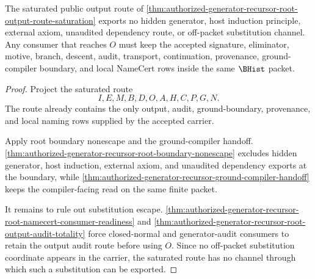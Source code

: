 \begin{theorem}
\label{thm:authorized-generator-recursor-root-boundary-nonescape-saturation}
The saturated public output route of \autoref{thm:authorized-generator-recursor-root-output-route-saturation} exports no hidden generator, host induction principle, external axiom, unaudited dependency route, or off-packet substitution channel. Any consumer that reaches $O$ must keep the accepted signature, eliminator, motive, branch, descent, audit, transport, continuation, provenance, ground-compiler boundary, and local NameCert rows inside the same $\BHist$ packet.
\end{theorem}
\begin{proof}
Project the saturated route
$$
I,E,M,B,D,O,A,H,C,P,G,N.
$$
The route already contains the only output, audit, ground-boundary, provenance, and local naming rows supplied by the accepted carrier.

Apply root boundary nonescape and the ground-compiler handoff. \autoref{thm:authorized-generator-recursor-root-boundary-nonescape} excludes hidden generator, host induction, external axiom, and unaudited dependency exports at the boundary, while \autoref{thm:authorized-generator-recursor-ground-compiler-handoff} keeps the compiler-facing read on the same finite packet.

It remains to rule out substitution escape. \autoref{thm:authorized-generator-recursor-root-namecert-consumer-readiness} and \autoref{thm:authorized-generator-recursor-root-output-audit-totality} force closed-normal and generator-audit consumers to retain the output audit route before using $O$. Since no off-packet substitution coordinate appears in the carrier, the saturated route has no channel through which such a substitution can be exported.
\end{proof}

